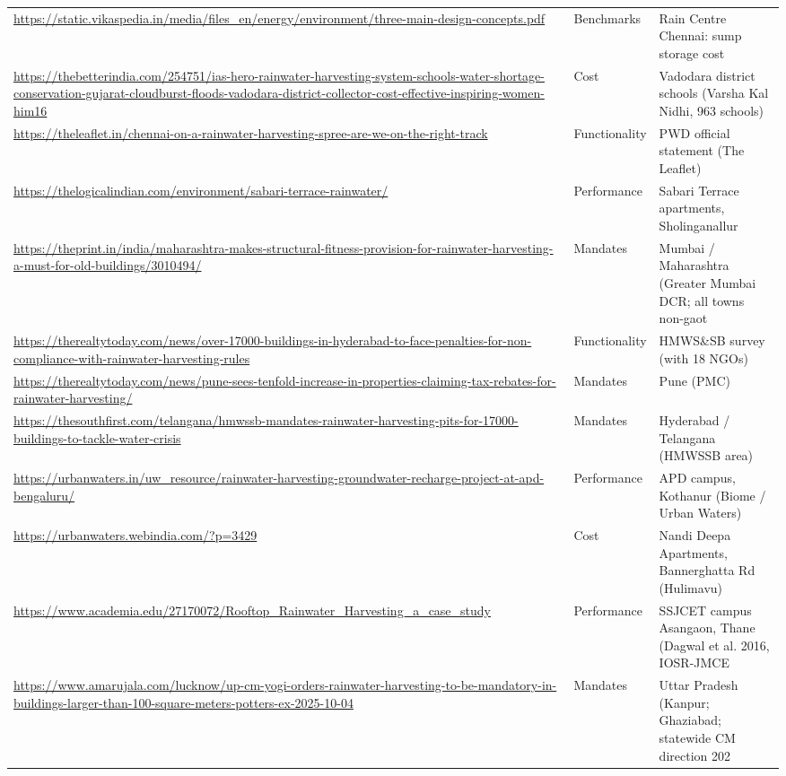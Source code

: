 {\begin{longtable}{p{9.2cm} p{2.5cm} p{4.2cm}}
\url{https://static.vikaspedia.in/media/files_en/energy/environment/three-main-design-concepts.pdf} & Benchmarks & Rain Centre Chennai: sump storage cost\\
\url{https://thebetterindia.com/254751/ias-hero-rainwater-harvesting-system-schools-water-shortage-conservation-gujarat-cloudburst-floods-vadodara-district-collector-cost-effective-inspiring-women-him16} & Cost & Vadodara district schools (Varsha Kal Nidhi, 963 schools)\\
\url{https://theleaflet.in/chennai-on-a-rainwater-harvesting-spree-are-we-on-the-right-track} & Functionality & PWD official statement (The Leaflet)\\
\url{https://thelogicalindian.com/environment/sabari-terrace-rainwater/} & Performance & Sabari Terrace apartments, Sholinganallur\\
\url{https://theprint.in/india/maharashtra-makes-structural-fitness-provision-for-rainwater-harvesting-a-must-for-old-buildings/3010494/} & Mandates & Mumbai / Maharashtra (Greater Mumbai DCR; all towns non-gaot\\
\url{https://therealtytoday.com/news/over-17000-buildings-in-hyderabad-to-face-penalties-for-non-compliance-with-rainwater-harvesting-rules} & Functionality & HMWS\&SB survey (with 18 NGOs)\\
\url{https://therealtytoday.com/news/pune-sees-tenfold-increase-in-properties-claiming-tax-rebates-for-rainwater-harvesting/} & Mandates & Pune (PMC)\\
\url{https://thesouthfirst.com/telangana/hmwssb-mandates-rainwater-harvesting-pits-for-17000-buildings-to-tackle-water-crisis} & Mandates & Hyderabad / Telangana (HMWSSB area)\\
\url{https://urbanwaters.in/uw_resource/rainwater-harvesting-groundwater-recharge-project-at-apd-bengaluru/} & Performance & APD campus, Kothanur (Biome / Urban Waters)\\
\url{https://urbanwaters.webindia.com/?p=3429} & Cost & Nandi Deepa Apartments, Bannerghatta Rd (Hulimavu)\\
\url{https://www.academia.edu/27170072/Rooftop_Rainwater_Harvesting_a_case_study} & Performance & SSJCET campus Asangaon, Thane (Dagwal et al. 2016, IOSR-JMCE\\
\url{https://www.amarujala.com/lucknow/up-cm-yogi-orders-rainwater-harvesting-to-be-mandatory-in-buildings-larger-than-100-square-meters-potters-ex-2025-10-04} & Mandates & Uttar Pradesh (Kanpur; Ghaziabad; statewide CM direction 202\\

\end{longtable}}
